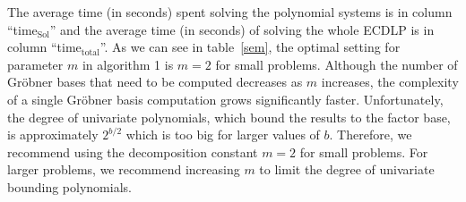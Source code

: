 \documentclass[thesis=M,english]{FITthesis}[2012/10/20]
\theoremstyle{remark}
\theoremstyle{definition}
\begin{document}
\noindent The average time (in seconds) spent solving the polynomial systems is in column \enquote{time$_\text{Sol}$}  and the average time (in seconds) of solving the whole ECDLP is in column \enquote{time$_\text{total}$}. As we can see in table~\ref{sem}, the optimal setting for parameter $m$ in algorithm 1 is $m=2$ for small problems. Although the number of Gröbner bases that need to be computed decreases as $m$ increases, the complexity of a single Gröbner basis computation grows significantly faster. Unfortunately, the degree of univariate polynomials, which bound the results to the factor base, is approximately $2^{b/2}$ which is too big for larger values of $b$. Therefore, we recommend using the decomposition constant $m=2$ for small problems. For larger problems, we recommend increasing $m$ to limit the degree of univariate bounding polynomials.
\end{document}
